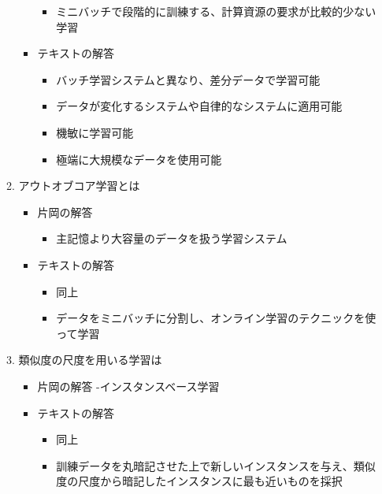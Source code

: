 \begin{itemize}
\begin{enumerate}
\begin{itemize}
      \begin{itemize}
      \tightlist
      \item
        ミニバッチで段階的に訓練する、計算資源の要求が比較的少ない学習
      \end{itemize}
    \item
      テキストの解答

      \begin{itemize}
      \tightlist
      \item
        バッチ学習システムと異なり、差分データで学習可能
      \item
        データが変化するシステムや自律的なシステムに適用可能
      \item
        機敏に学習可能
      \item
        極端に大規模なデータを使用可能
      \end{itemize}
    \end{itemize}
  \item
    アウトオブコア学習とは

    \begin{itemize}
    \tightlist
    \item
      片岡の解答

      \begin{itemize}
      \tightlist
      \item
        主記憶より大容量のデータを扱う学習システム
      \end{itemize}
    \item
      テキストの解答

      \begin{itemize}
      \tightlist
      \item
        同上
      \item
        データをミニバッチに分割し、オンライン学習のテクニックを使って学習
      \end{itemize}
    \end{itemize}
  \item
    類似度の尺度を用いる学習は

    \begin{itemize}
    \tightlist
    \item
      片岡の解答 -インスタンスベース学習
    \item
      テキストの解答

      \begin{itemize}
      \tightlist
      \item
        同上
      \item
        訓練データを丸暗記させた上で新しいインスタンスを与え、類似度の尺度から暗記したインスタンスに最も近いものを採択
      \end{itemize}
    \end{itemize}
  \end{enumerate}
\end{itemize}

